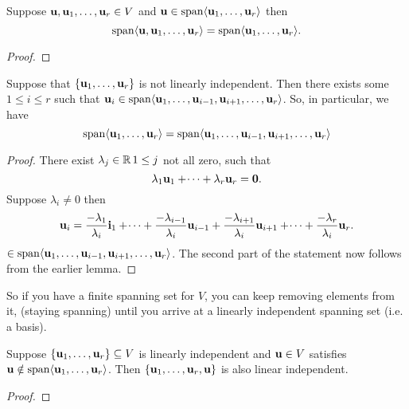 \documentclass[10pt, a4paper]{article}
\begin{document}
\begin{lemma}
    Suppose $\mathbf{u}, \mathbf{u}_1, \dotsc, \mathbf{u}_r \in V$ and $\mathbf{u} \in \mathrm{span}\langle\mathbf{u}_1, \dotsc, \mathbf{u}_r\rangle$ then
    \[
    \mathrm{span}\langle\mathbf{u}, \mathbf{u}_1, \dotsc, \mathbf{u}_r\rangle = \mathrm{span}\langle\mathbf{u}_1, \dotsc, \mathbf{u}_r\rangle.
    \]
    \begin{proof}
    \end{proof}
\end{lemma}

\begin{lemma}
    Suppose that $\{\mathbf{u}_1, \dotsc, \mathbf{u}_r\}$ is not linearly independent.
    Then there exists some $1 \leq i \leq r$ such that $\mathbf{u}_i \in \mathrm{span}\langle\mathbf{u}_1, \dotsc, \mathbf{u}_{i - 1}, \mathbf{u}_{i + 1}, \dotsc, \mathbf{u}_r\rangle$.
    So, in particular,
    we have
    \[
    \mathrm{span}\langle\mathbf{u}_1, \dotsc, \mathbf{u}_r\rangle = \mathrm{span}\langle\mathbf{u}_1, \dotsc, \mathbf{u}_{i - 1}, \mathbf{u}_{i + 1}, \dotsc, \mathbf{u}_r\rangle
    \]
    \begin{proof}
        There exist $\lambda_j \in \mathbb{R}\, 1 \leq j$ not all zero,
        such that
        \[
        \lambda_1\mathbf{u}_1 + \dotsi + \lambda_r\mathbf{u}_r = \mathbf{0}.
        \]
        Suppose $\lambda_i \neq 0$ then
        \[
        \mathbf{u}_i = \frac{-\lambda_1}{\lambda_i}\mathbf{i}_1 + \dotsi + \frac{-\lambda_{i - 1}}{\lambda_i}\mathbf{u}_{i - 1} + \frac{-\lambda_{i + 1}}{\lambda_i}\mathbf{u}_{i + 1} + \dotsi + \frac{-\lambda_r}{\lambda_i}\mathbf{u}_r.
        \]
        $\in \mathrm{span}\langle\mathbf{u}_1, \dotsc, \mathbf{u}_{i - 1}, \mathbf{u}_{i + 1}, \dotsc, \mathbf{u}_r\rangle$.
        The second part of the statement now follows from the earlier lemma.
    \end{proof}
\end{lemma}

So if you have a finite spanning set for $V$,
you can keep removing elements from it,
(staying spanning)
until you arrive at a linearly independent spanning set
(i.e. a basis).

\begin{lemma}
    Suppose $\{\mathbf{u}_1, \dotsc, \mathbf{u}_r\} \subseteq V$ is linearly independent and $\mathbf{u} \in V$ satisfies $\mathbf{u} \notin \mathrm{span}\langle\mathbf{u}_1, \dotsc, \mathbf{u}_r\rangle$.
    Then $\{\mathbf{u}_1, \dotsc, \mathbf{u}_r, \mathbf{u}\}$ is also linear independent.
    \begin{proof}
    \end{proof}
\end{lemma}
\end{document}
